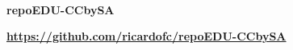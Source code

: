 \begin{adjustbox}{width=0.94\paperwidth,center}
\begin{tcolorbox}[colback=blue!5!white,colframe=blue!50!black,
  colbacktitle=blue!75!black,title=Ligazóns,fonttitle=\bfseries\color{white}]
\vspace*{-0.2cm} \DrawLine\\ \textbf{repoEDU-CCbySA}

    \par 
      \href{https://github.com/ricardofc/repoEDU-CCbySA}{\textbf{\color{blue}https://github.com/ricardofc/repoEDU-CCbySA}}

\vspace*{-0.2cm}
\end{tcolorbox}
\end{adjustbox}
\vspace*{-2cm}
